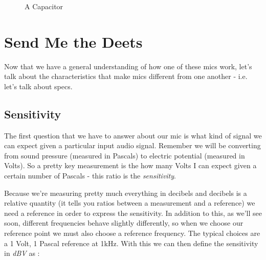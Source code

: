 \documentclass[10pt,a5paper]{book}
\begin{document}
\begin{figure}[!htb]
\caption{\label{fig:my-label} A Capacitor}
\end{figure}


\clearpage
\section{Send Me the Deets}
Now that we have a general understanding of how one of these mics work, let's talk about the characteristics that make mics different from one another - i.e. let's talk about specs. 

\subsection{Sensitivity}
The first question that we have to answer about our mic is what kind of signal we can expect given a particular input audio signal. Remember we will be converting from sound pressure (measured in Pascals) to electric potential (measured in Volts). So a pretty key measurement is the how many Volts I can expect given a certain number of Pascals - this ratio is the \textit{sensitivity}.

Because we're measuring pretty much everything in decibels and decibels is a relative quantity (it tells you ratios between a measurement and a reference) we need a reference in order to express the sensitivity. In addition to this, as we'll see soon, different frequencies behave slightly differently, so when we choose our reference point we must also choose a reference frequency. The typical choices are a 1 Volt, 1 Pascal reference at 1kHz. With this we can then define the sensitivity in \textit{dBV} as \cite{jlewis}:
\end{document}
